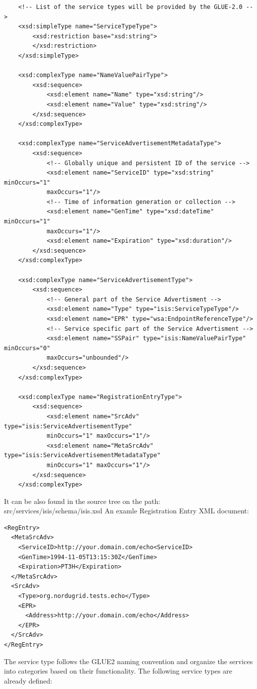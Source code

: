 \begin{verbatim}
    <!-- List of the service types will be provided by the GLUE-2.0 -->
    <xsd:simpleType name="ServiceTypeType">
        <xsd:restriction base="xsd:string">
        </xsd:restriction>
    </xsd:simpleType>

    <xsd:complexType name="NameValuePairType">
        <xsd:sequence>
            <xsd:element name="Name" type="xsd:string"/>
            <xsd:element name="Value" type="xsd:string"/>
        </xsd:sequence>
    </xsd:complexType>

    <xsd:complexType name="ServiceAdvertisementMetadataType">
        <xsd:sequence>
            <!-- Globally unique and persistent ID of the service -->
            <xsd:element name="ServiceID" type="xsd:string" minOccurs="1" 
            maxOccurs="1"/>
            <!-- Time of information generation or collection -->
            <xsd:element name="GenTime" type="xsd:dateTime" minOccurs="1" 
            maxOccurs="1"/>
            <xsd:element name="Expiration" type="xsd:duration"/>
        </xsd:sequence>
    </xsd:complexType>

    <xsd:complexType name="ServiceAdvertisementType">
        <xsd:sequence>
            <!-- General part of the Service Advertisment -->
            <xsd:element name="Type" type="isis:ServiceTypeType"/>
            <xsd:element name="EPR" type="wsa:EndpointReferenceType"/>
            <!-- Service specific part of the Service Advertisment -->
            <xsd:element name="SSPair" type="isis:NameValuePairType" minOccurs="0" 
            maxOccurs="unbounded"/>
        </xsd:sequence>
    </xsd:complexType>

    <xsd:complexType name="RegistrationEntryType">
        <xsd:sequence>
            <xsd:element name="SrcAdv" type="isis:ServiceAdvertisementType" 
            minOccurs="1" maxOccurs="1"/>
            <xsd:element name="MetaSrcAdv" type="isis:ServiceAdvertisementMetadataType" 
            minOccurs="1" maxOccurs="1"/>
        </xsd:sequence>
    </xsd:complexType>
\end{verbatim}
It can be also found in the source tree on the path: src/services/isis/schema/isis.xsd
An examle Registration Entry XML document:
\begin{verbatim}
<RegEntry>
  <MetaSrcAdv>
    <ServiceID>http://your.domain.com/echo<ServiceID>
    <GenTime>1994-11-05T13:15:30Z</GenTime>
    <Expiration>PT3H</Expiration>
  </MetaSrcAdv>
  <SrcAdv>
    <Type>org.nordugrid.tests.echo</Type>
    <EPR>
      <Address>http://your.domain.com/echo</Address>
    </EPR>
  </SrcAdv>
</RegEntry>
\end{verbatim}
The service type follows the GLUE2 naming convention and organize the services into categories based on their functionality. The following service types are already defined:

